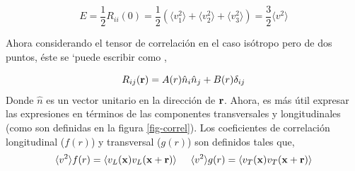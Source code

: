 \documentclass[executivepaper,12pt]{article}
\numberwithin{equation}{section}
\begin{document}
\begin{equation*}
	E=\frac{1}{2}R_{ii}(0)=\frac{1}{2}\left(\langle v_1^2\rangle+\langle v_2^2\rangle+\langle v_3^2\rangle\right)=\frac{3}{2}\langle v^2\rangle \label{eq.ener2}
\end{equation*}

Ahora considerando el tensor de correlación en el caso isótropo pero de dos puntos, éste se `puede escribir como \parencite{landau1959,mccomb1990}, 

\begin{equation}
	R_{ij}(\vb{r})=A(r)\hat{n}_i\hat{n}_j+B(r)\delta_{ij}
\end{equation}
Donde $\hat{n}$ es un vector unitario en la dirección de $\vb{r}$. Ahora, es más útil expresar las expresiones en términos de las componentes transversales y longitudinales (como son definidas en la figura \ref{fig-correl}). Los coeficientes de correlación longitudinal ($f(r)$) y transversal ($g(r)$) son definidos tales que,
\begin{equation*}
	\langle v^2 \rangle f(r)=\langle v_L(\vb{x})v_L(\vb{x}+\vb{r}) \rangle\hspace{0.5cm} \langle v^2 \rangle g(r)=\langle v_T(\vb{x})v_T(\vb{x}+\vb{r})\rangle
\end{equation*}
\end{document}
